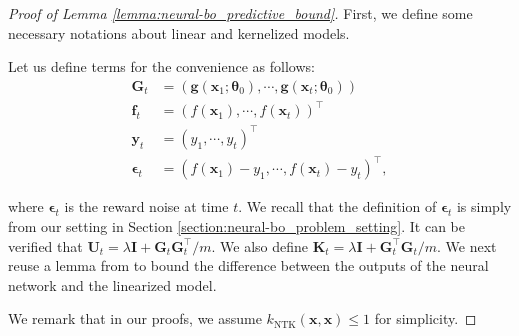 \begin{proof}[Proof of Lemma \ref{lemma:neural-bo_predictive_bound}]

First, we define some necessary notations about linear and kernelized models.  
\begin{subdefinition}
\label{def:linear_kernelized_terms}
Let us define terms for the convenience as follows:
\begin{equation*}
\begin{split}
\mathbf{G}_t & = (\mathbf{g}(\mathbf{x}_1; \boldsymbol{\theta}_0),\cdots,\mathbf{g}(\mathbf{x}_t; \boldsymbol{\theta}_0))\\
     \mathbf{f}_t & = (f(\mathbf{x}_1), \cdots, f(\mathbf{x}_t))^\top \\
     \mathbf{y}_t & = (y_1, \cdots, y_t)^\top \\
     \boldsymbol{\epsilon}_t & = (f(\mathbf{x}_1) - y_1, \cdots, f(\mathbf{x}_t) - y_t)^\top,
\end{split}
\end{equation*}
\end{subdefinition}
\noindent where $\boldsymbol{\epsilon}_t$ is the reward noise at time $t$. We recall that the definition of $\boldsymbol{\epsilon}_t$ is simply from our setting in Section \ref{section:neural-bo_problem_setting}. It can be verified that $\mathbf{U}_t = \lambda\mathbf{I} + \mathbf{G}_t\mathbf{G}_t^\top/m$. 
We also define $\mathbf{K}_t = \lambda\mathbf{I} + \mathbf{G}_t ^\top\mathbf{G}_t /m$. 
We next reuse a lemma from \citet{zhang2021neural} to bound the difference between the outputs of the neural network and the linearized model.


\noindent We remark that in our proofs, we assume $k_{\text{NTK}}(\mathbf{x}, \mathbf{x}) \leq 1$ for simplicity. 


\end{proof}
